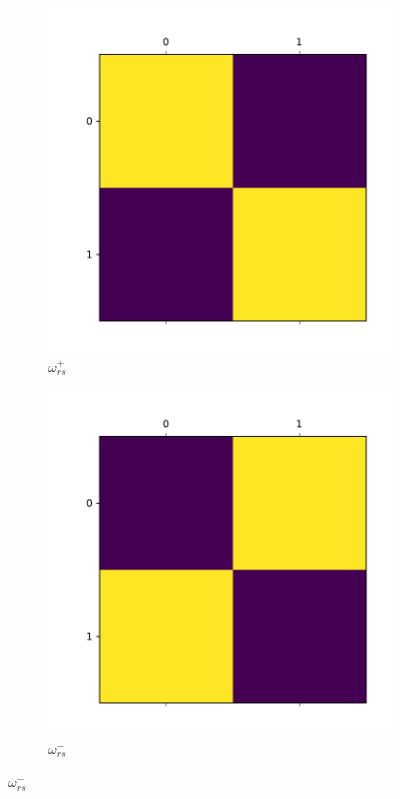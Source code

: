 \documentclass{beamer}
\begin{document}
\begin{frame}[c]
\begin{figure}
\begin{center}
\begin{subfigure}[b]{0.3\textwidth}
				\includegraphics[width=\textwidth]{out/synthetic/omega_positive1.pdf}
				\caption{$\omega ^{+} _{rs} $}
				\label{fig:out/synthetic/omega_positive1.pdf}
			\end{subfigure}
			\begin{subfigure}[b]{0.3\textwidth}
				\centering
				\includegraphics[width=\textwidth]{out/synthetic/omega_negative1.pdf}
				\caption{$\omega ^{-} _{rs} $}
				\label{fig:}
			\end{subfigure}
		\end{center}
	\end{figure}


\end{frame}
\end{document}
